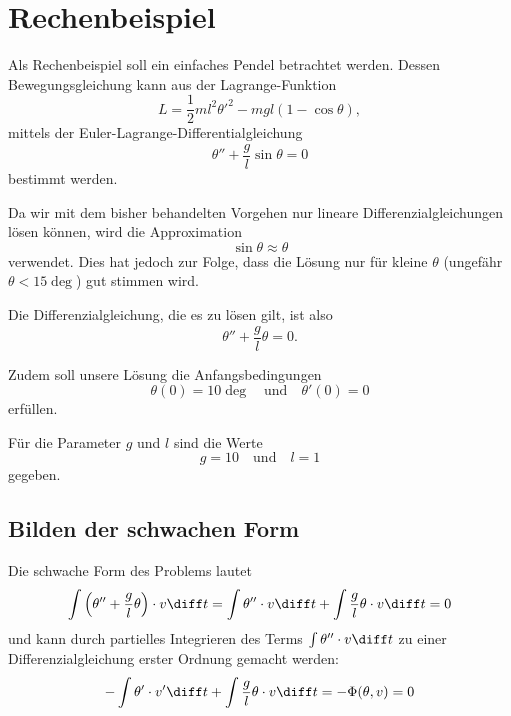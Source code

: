 %
%
%
%
\section{Rechenbeispiel\label{fem:rechenbsp}}

Als Rechenbeispiel soll ein einfaches Pendel betrachtet werden. 
Dessen Bewegungsgleichung kann aus der Lagrange-Funktion
\begin{equation}
    L = \frac{1}{2} m l^2 {\theta'}^2 - m g l (1 - \cos \theta),
\end{equation}
mittels der Euler-Lagrange-Differentialgleichung
\begin{equation}
    \theta'' + \frac{g}{l} \sin \theta = 0
\end{equation}
bestimmt werden.

Da wir mit dem bisher behandelten Vorgehen nur lineare Differenzialgleichungen lösen können, wird die Approximation
\begin{equation}
    \sin \theta \approx \theta
\end{equation}
verwendet.
Dies hat jedoch zur Folge, dass die Lösung nur für kleine $\theta$ (ungefähr $\theta < 15 \deg$) gut stimmen wird.

Die Differenzialgleichung, die es zu lösen gilt, ist also
\begin{equation}
    \theta'' + \frac{g}{l} \theta = 0.
\end{equation}

Zudem soll unsere Lösung die Anfangsbedingungen
\begin{equation}
    \theta(0) = 10 \deg
    \quad \text{und} \quad
    \theta'(0) = 0
\end{equation}
erfüllen.

Für die Parameter $g$ und $l$ sind die Werte
\begin{equation}
    g = 10
    \quad \text{und} \quad
    l = 1
\end{equation}
gegeben.


\subsection{Bilden der schwachen Form}
Die schwache Form des Problems lautet
\begin{equation}
    \int \left( \theta'' + \frac{g}{l} \theta \right) \cdot v \diff t 
    = \int \theta'' \cdot v \diff t + \int \frac{g}{l} \theta \cdot v \diff t
    = 0
\end{equation}
und kann durch partielles Integrieren des Terms $\int \theta'' \cdot v \diff t$ zu einer Differenzialgleichung erster Ordnung gemacht werden:
\begin{equation}
    - \int \theta' \cdot v' \diff t + \int \frac{g}{l} \theta \cdot v \diff t = -\Phi(\theta, v) = 0
    \label{fem:rechenbsp:schwache_form}
\end{equation}


